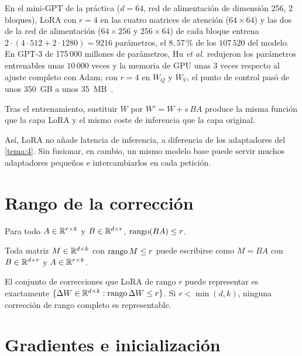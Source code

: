\addtocounter{definicion}{1}%

En el mini-GPT de la práctica ($d=64$, red de alimentación de dimensión 256, 2 bloques), LoRA con $r=4$ en las cuatro matrices de atención ($64\times 64$) y las dos de la red de alimentación ($64\times 256$ y $256\times 64$) de cada bloque entrena $2\cdot(4\cdot 512+2\cdot 1280)=9216$ parámetros, el $8{,}57\,\%$ de los $107\,520$ del modelo. En GPT-3 de 175\,000 millones de parámetros, Hu \emph{et al.} redujeron los parámetros entrenables unas $10\,000$ veces y la memoria de GPU unas 3 veces respecto al ajuste completo con Adam; con $r=4$ en $W_Q$ y $W_V$, el punto de control pasó de unos 350~GB a unos 35~MB~\cite[§4.2]{hu-lora}.

\begin{proposicion}[Fusión]\label{prop:fusion}
Tras el entrenamiento, sustituir $W$ por $W'=W+s\,BA$ produce la misma función que la capa LoRA y el mismo coste de inferencia que la capa original.
\end{proposicion}

Así, LoRA no añade latencia de inferencia, a diferencia de los adaptadores del \cref{tema:4}. Sin fusionar, en cambio, un mismo modelo base puede servir muchos adaptadores pequeños e intercambiarlos en cada petición.

\section{Rango de la corrección}

\begin{proposicion}\label{prop:rango}
Para todo $A\in\mathbb{R}^{r\times k}$ y $B\in\mathbb{R}^{d\times r}$, $\operatorname{rango}(BA)\le r$.
\end{proposicion}

\begin{proposicion}[Recíproco]\label{prop:factorizacion}
Toda matriz $M\in\mathbb{R}^{d\times k}$ con $\operatorname{rango} M\le r$ puede escribirse como $M=BA$ con $B\in\mathbb{R}^{d\times r}$ y $A\in\mathbb{R}^{r\times k}$.
\end{proposicion}

\begin{corolario}\label{cor:representables}
El conjunto de correcciones que LoRA de rango $r$ puede representar es exactamente $\{\Delta W\in\mathbb{R}^{d\times k}:\operatorname{rango}\Delta W\le r\}$. Si $r<\min(d,k)$, ninguna corrección de rango completo es representable.
\end{corolario}

\section{Gradientes e inicialización}

